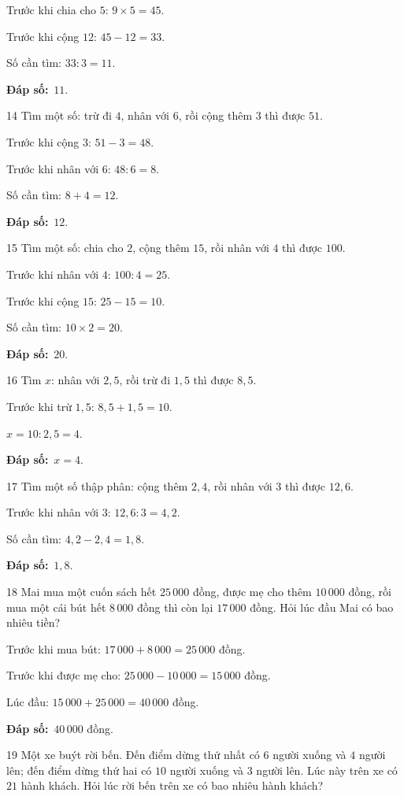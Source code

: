 \documentclass[11pt]{article}
\newif\ifsol \solfalse
\providecommand{\AnsWord}{Đáp số}
\newcommand{\dapso}[1]{\par\textbf{\AnsWord:}\ #1}
\newcommand{\probsol}[1]{%
  \begin{lrbox}{\solmeasure}\begin{minipage}{\dimexpr\linewidth-24pt\relax}#1\end{minipage}\end{lrbox}%
  \ifsol
    \begin{solbox}#1\end{solbox}%
  \else
    \setlength{\solht}{\dimexpr\ht\solmeasure+\dp\solmeasure+0.85cm\relax}%
    \ifdim\solht<1.35cm\setlength{\solht}{1.35cm}\fi
    \begin{tcolorbox}[colback=white,colframe=Line,boxrule=0.8pt,arc=5pt,
      left=8pt,right=8pt,top=4pt,bottom=4pt,height=\solht]{\footnotesize\color{Slate}\itshape\WorkWord}\end{tcolorbox}%
  \fi}
\newcommand{\gap}{\vspace{0.3cm}}
\def\WorkWord{Bài làm:}
\def\AnsWord{Đáp số}
\begin{document}
\probsol{
Trước khi chia cho $5$: $9\times5=45$.\par Trước khi cộng $12$: $45-12=33$.\par Số cần tìm: $33:3=11$.
\dapso{$11$.}}
\gap
\begin{probbox}{14}{\relax}
Tìm một số: trừ đi $4$, nhân với $6$, rồi cộng thêm $3$ thì được $51$.
\end{probbox}
\probsol{
Trước khi cộng $3$: $51-3=48$.\par Trước khi nhân với $6$: $48:6=8$.\par Số cần tìm: $8+4=12$.
\dapso{$12$.}}
\gap
\begin{probbox}{15}{\relax}
Tìm một số: chia cho $2$, cộng thêm $15$, rồi nhân với $4$ thì được $100$.
\end{probbox}
\probsol{
Trước khi nhân với $4$: $100:4=25$.\par Trước khi cộng $15$: $25-15=10$.\par Số cần tìm: $10\times2=20$.
\dapso{$20$.}}
\gap
\begin{probbox}{16}{\relax}
Tìm $x$: nhân với $2{,}5$, rồi trừ đi $1{,}5$ thì được $8{,}5$.
\end{probbox}
\probsol{
Trước khi trừ $1{,}5$: $8{,}5+1{,}5=10$.\par $x=10:2{,}5=4$.
\dapso{$x=4$.}}
\gap
\begin{probbox}{17}{\relax}
Tìm một số thập phân: cộng thêm $2{,}4$, rồi nhân với $3$ thì được $12{,}6$.
\end{probbox}
\probsol{
Trước khi nhân với $3$: $12{,}6:3=4{,}2$.\par Số cần tìm: $4{,}2-2{,}4=1{,}8$.
\dapso{$1{,}8$.}}
\gap
\begin{probbox}{18}{\relax}
Mai mua một cuốn sách hết $25\,000$ đồng, được mẹ cho thêm $10\,000$ đồng, rồi mua một cái bút hết $8\,000$ đồng thì còn lại $17\,000$ đồng. Hỏi lúc đầu Mai có bao nhiêu tiền?
\end{probbox}
\probsol{
Trước khi mua bút: $17\,000+8\,000=25\,000$ đồng.\par Trước khi được mẹ cho: $25\,000-10\,000=15\,000$ đồng.\par Lúc đầu: $15\,000+25\,000=40\,000$ đồng.
\dapso{$40\,000$ đồng.}}
\gap
\begin{probbox}{19}{\relax}
Một xe buýt rời bến. Đến điểm dừng thứ nhất có $6$ người xuống và $4$ người lên; đến điểm dừng thứ hai có $10$ người xuống và $3$ người lên. Lúc này trên xe có $21$ hành khách. Hỏi lúc rời bến trên xe có bao nhiêu hành khách?
\end{probbox}
\end{document}
